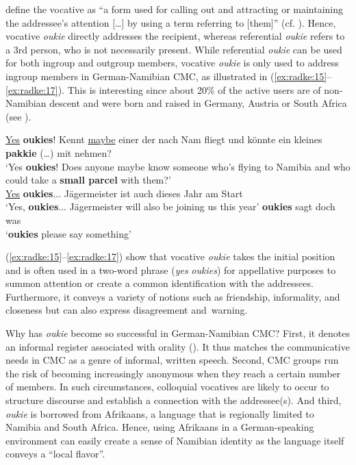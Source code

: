 \documentclass[output=paper]{langsci/langscibook}
\begin{document}
\citet[626]{daniel_vocative_2008} define the vocative as “a form used for calling out and attracting or maintaining the addressee’s attention […] by using a term referring to [them]” (cf. \citealt[2]{sonnenhauser_vocative!:_2013}). Hence, vocative \textit{oukie} directly addresses the recipient, whereas referential \textit{oukie} refers to a 3rd person, who is not necessarily present. While referential \textit{oukie} can be used for both ingroup and outgroup members, vocative \textit{oukie} is only used to address ingroup members in German-Namibian CMC, as illustrated in (\ref{ex:radke:15}--\ref{ex:radke:17}). This is interesting since about 20\% of the active users are of non-Namibian descent and were born and raised in Germany, Austria or South Africa (see \citealt{radke_urban_inpress}).   

\ea 
 \label{ex:radke:15}
 \underline{Yes} \textbf{oukies}! Kennt \underline{maybe} einer der nach Nam fliegt und könnte ein kleines \textbf{pakkie} (…) mit nehmen?\smallskip\\\relax
 ‘Yes \textbf{oukies}! Does anyone maybe know someone who’s flying to Namibia and who could take a \textbf{small parcel} with them?’\\
 \ex
\label{ex:radke:16}
 \underline{Yes} \textbf{oukies}... Jägermeister ist auch dieses Jahr am Start\smallskip\\\relax
 ‘{{Yes}}, \textbf{{oukies}}... Jägermeister will also be joining us this year’
 \ex\label{ex:radke:17}
 \textbf{oukies} sagt doch was\smallskip\\\relax
 ‘\textbf{{oukies}} {please say something}’
 \z
 
(\ref{ex:radke:15}--\ref{ex:radke:17}) show that vocative \textit{oukie} takes the initial position and is often used in a two-word phrase (\textit{yes} \textit{oukies}) for appellative purposes to summon attention or create a common identification with the addressees. Furthermore, it conveys a variety of notions such as friendship, informality, and closeness but can also express disagreement and~warning. 

Why has \textit{oukie} become so successful in German-Namibian CMC? First, it denotes an informal register associated with orality (\citealt[275]{wiese_registerdifferenzierung_2021}). It thus matches the communicative needs in CMC as a genre of informal, written speech. Second, CMC groups run the risk of becoming increasingly anonymous when they reach a certain number of members. In such circumstances, colloquial vocatives are likely to occur to structure discourse and establish a connection with the addressee(s). And third, \textit{oukie} is borrowed from Afrikaans, a language that is regionally limited to Namibia and South Africa. Hence, using Afrikaans in a German-speaking environment can easily create a sense of Namibian identity as the language itself conveys a “local flavor”. 
\end{document}
